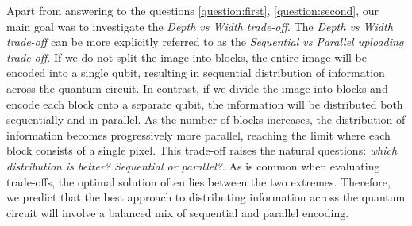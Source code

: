Apart from answering to the questions \ref{question:first}, \ref{question:second}, our main goal was to 
investigate the \textit{Depth vs Width trade-off}.
The \textit{Depth vs Width trade-off} can be more explicitly referred to as the
\textit{Sequential vs Parallel uploading trade-off}.
If we do not split the image into blocks, the entire image will be encoded into a single qubit, 
resulting in sequential distribution of information across the quantum circuit. 
In contrast, if we divide the image into blocks and encode each block onto a separate qubit, 
the information will be distributed both sequentially and in parallel. As the number of blocks increases, 
the distribution of information becomes progressively more parallel, reaching the limit where each 
block consists of a single pixel.
This trade-off raises the natural questions: \textit{which distribution is better? Sequential or parallel?}.
As is common when evaluating trade-offs, the optimal solution often lies between the two extremes. 
Therefore, we predict that the best approach to distributing information across the quantum circuit 
will involve a balanced mix of sequential and parallel encoding.\\

